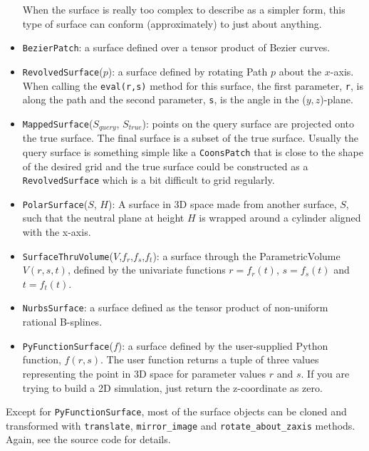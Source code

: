 \begin{itemize}
  When the surface is really too complex to describe as a simpler form,
  this type of surface can conform (approximately) to just about anything.
\item \texttt{BezierPatch}: a surface defined over a tensor product of Bezier curves. 
\item \texttt{RevolvedSurface}($p$): a surface defined by rotating Path $p$
  about the $x$-axis.
  When calling the \texttt{eval(r,s)} method for this surface, 
  the first parameter, \texttt{r}, is along the path and the second parameter, 
  \texttt{s}, is the angle in the ($y,z$)-plane.
\item \texttt{MappedSurface}($S_{query}$, $S_{true}$): points on the
  query surface are projected onto the true surface.
  The final surface is a subset of the true surface.
  Usually the query surface is something simple like a \texttt{CoonsPatch}
  that is close to the shape of the desired grid and
  the true surface could be constructed as a \texttt{RevolvedSurface} which is
  a bit difficult to grid regularly.
\item \texttt{PolarSurface}($S$, $H$): A surface in 3D space made from another surface, $S$,
  such that the neutral plane at height $H$ is wrapped around a cylinder aligned with
  the x-axis.
\item \texttt{SurfaceThruVolume}($V$,$f_r$,$f_s$,$f_t$): a surface through the
  ParametricVolume $V(r,s,t)$, defined by the univariate functions 
  $r=f_r(t)$, $s=f_s(t)$ and $t=f_t(t)$.
\item \texttt{NurbsSurface}: a surface defined as the tensor product of non-uniform rational B-splines.
\item \texttt{PyFunctionSurface}($f$): a surface defined by the user-supplied Python function, $f(r,s)$.
  The user function returns a tuple of three values representing the point in 3D space 
  for parameter values $r$ and $s$.
  If you are trying to build a 2D simulation, just return the z-coordinate as zero.
\end{itemize} 

Except for \texttt{PyFunctionSurface}, most of the surface objects can be cloned and transformed
with \texttt{translate}, \texttt{mirror\_image} and \texttt{rotate\_about\_zaxis} methods.
Again, see the source code for details.


